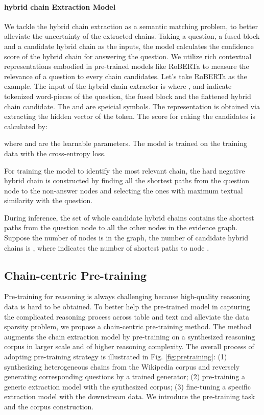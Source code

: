 \documentclass[11pt]{article}
\begin{document}
	\paragraph{hybrid chain Extraction Model}
	We tackle the hybrid chain extraction as a semantic matching problem, to better alleviate the uncertainty of the extracted chains. Taking a question, a fused block and a candidate hybrid chain as the inputs, the model calculates the confidence score of the hybrid chain for answering the question. 
	We utilize rich contextual representations embodied in pre-trained models like RoBERTa to measure the relevance of a question to every chain candidates. 
	Let's take RoBERTa as the example. The input of the hybrid chain extractor is 
	where ,  and  indicate tokenized word-pieces of the question, the fused block and the flattened  hybrid chain candidate. The  and  are speicial symbols. The representation  is obtained via extracting the hidden vector of the  token. 
	The score  for raking the candidates is calculated by:
	
	where  and  are the learnable parameters.
The model is trained on the training data with the cross-entropy loss.
	
For training the model to identify the most relevant chain, the hard negative hybrid chain is constructed by finding all the shortest paths from the question node to the non-answer nodes and selecting the ones with maximum textual similarity with the question.
	
	During inference, the set of whole candidate hybrid chains contains the shortest paths from the question node to all the other nodes in the evidence graph. 
	Suppose the number of nodes is  in the graph, the number of candidate hybrid chains is , where  indicates the number of shortest paths to node .
	\fi
	
	\subsection{Chain-centric Pre-training}\label{sec:ec-pretrain}
	Pre-training for reasoning is always challenging because high-quality reasoning data is hard to be obtained.
	To better help the pre-trained model in capturing the complicated reasoning process across table and text and alleviate the data sparsity problem, we propose a chain-centric pre-training method.
	The method augments the chain extraction model by pre-training on a synthesized reasoning corpus in larger scale and of higher reasoning complexity.
	The overall process of adopting pre-training strategy is illustrated in Fig. \ref{fig:pretraining}: 
	(1) synthesizing heterogeneous chains from the Wikipedia corpus and reversely generating corresponding questions by a trained generator;
(2) pre-training a generic extraction model with the synthesized corpus; 
(3) fine-tuning a specific extraction model with the downstream data. 
	We introduce the pre-training task and the corpus construction.
	
\end{document}
